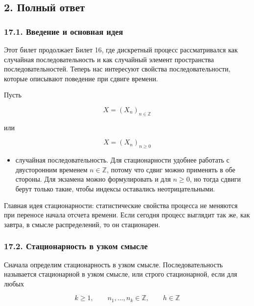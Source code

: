 \documentclass[
  11pt,
  a4paper,
]{article}
\providecommand{\tightlist}{%
  \setlength{\itemsep}{0pt}\setlength{\parskip}{0pt}}
\begin{document}
\subsection{2. Полный
ответ}\label{ux43fux43eux43bux43dux44bux439-ux43eux442ux432ux435ux442}

\subsubsection{17.1. Введение и основная
идея}\label{ux432ux432ux435ux434ux435ux43dux438ux435-ux438-ux43eux441ux43dux43eux432ux43dux430ux44f-ux438ux434ux435ux44f}

Этот билет продолжает Билет 16, где дискретный процесс рассматривался
как случайная последовательность и как случайный элемент пространства
последовательностей. Теперь нас интересуют свойства последовательности,
которые описывают поведение при сдвиге времени.

Пусть

\[
X=(X_n)_{n\in\mathbb Z}
\]

или

\[
X=(X_n)_{n\ge0}
\]

\begin{itemize}
\tightlist
\item
  случайная последовательность. Для стационарности удобнее работать с
  двусторонним временем \(n\in\mathbb Z\), потому что сдвиг можно
  применять в обе стороны. Для экзамена можно формулировать и для
  \(n\ge0\), но тогда сдвиги берут только такие, чтобы индексы
  оставались неотрицательными.
\end{itemize}

Главная идея стационарности: статистические свойства процесса не
меняются при переносе начала отсчета времени. Если сегодня процесс
выглядит так же, как завтра, в смысле распределений, то он стационарен.

\subsubsection{17.2. Стационарность в узком
смысле}\label{ux441ux442ux430ux446ux438ux43eux43dux430ux440ux43dux43eux441ux442ux44c-ux432-ux443ux437ux43aux43eux43c-ux441ux43cux44bux441ux43bux435}

Сначала определим стационарность в узком смысле. Последовательность
называется стационарной в узком смысле, или строго стационарной, если
для любых

\[
k\ge1,\qquad n_1,\ldots,n_k\in\mathbb Z,\qquad h\in\mathbb Z
\]
\end{document}
